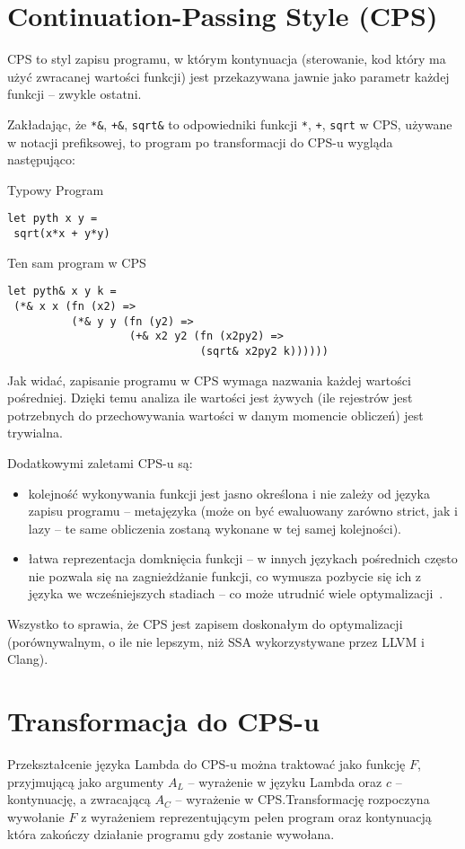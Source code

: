 \documentclass[11pt]{scrartcl}
\begin{document}
\section{Continuation-Passing Style (CPS)}
CPS to styl zapisu programu, w którym kontynuacja (sterowanie, kod który ma użyć
zwracanej wartości funkcji) jest przekazywana jawnie jako parametr każdej
funkcji -- zwykle ostatni.

Zakładając, że \lstinline|*&|, \lstinline|+&|, \lstinline|sqrt&| to  odpowiedniki funkcji \lstinline|*|, \lstinline|+|, \lstinline|sqrt|  w CPS, używane
w notacji prefiksowej, to program po transformacji do CPS-u wygląda następująco:

Typowy Program
\begin{lstlisting}
let pyth x y =
 sqrt(x*x + y*y)
\end{lstlisting}

Ten sam program w CPS
\begin{lstlisting}
let pyth& x y k =
 (*& x x (fn (x2) =>
          (*& y y (fn (y2) =>
                   (+& x2 y2 (fn (x2py2) =>
                              (sqrt& x2py2 k))))))

\end{lstlisting}


Jak widać, zapisanie programu w CPS wymaga nazwania każdej wartości pośredniej.
Dzięki temu analiza ile wartości jest żywych (ile rejestrów jest potrzebnych do
przechowywania wartości w danym momencie obliczeń) jest trywialna.


Dodatkowymi zaletami CPS-u są:
\begin{itemize}
\item kolejność wykonywania funkcji jest jasno określona i nie zależy od
  języka zapisu programu -- metajęzyka (może on być ewaluowany zarówno strict, jak i lazy -- te same obliczenia
  zostaną wykonane w tej samej kolejności).
\item łatwa reprezentacja domknięcia funkcji -- w innych językach pośrednich
  często nie pozwala się na zagnieżdżanie funkcji, co wymusza pozbycie się ich z
  języka we wcześniejszych stadiach -- co może utrudnić wiele
  optymalizacji~\cite[Chapter 1.2: Advantages of CPS]{Appel}.
\end{itemize}
Wszystko to sprawia, że CPS jest zapisem doskonałym do optymalizacji
(porównywalnym, o ile nie lepszym, niż SSA wykorzystywane przez LLVM i Clang).



\section{Transformacja do CPS-u}
Przekształcenie języka Lambda do CPS-u można traktować jako funkcję $F$,
przyjmującą jako argumenty $A_L$ -- wyrażenie w języku Lambda oraz $c$ -- kontynuację, a
zwracającą $A_C$ -- wyrażenie w CPS.\@ Transformację rozpoczyna wywołanie $F$ z
wyrażeniem reprezentującym pełen program oraz kontynuacją która zakończy
działanie programu gdy zostanie wywołana.
\end{document}
